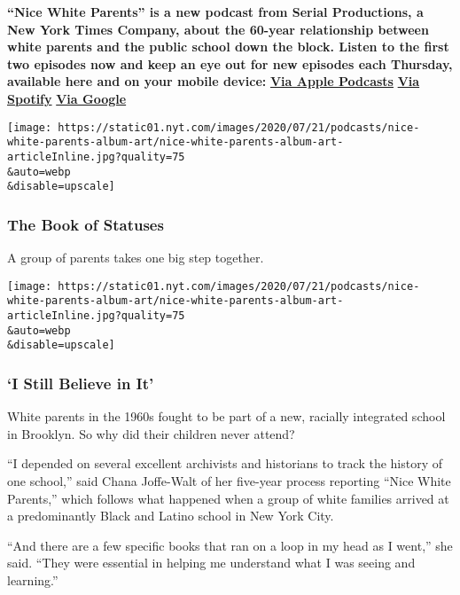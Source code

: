 \textbf{``Nice White Parents'' is a new podcast from Serial Productions,
a New York Times Company, about the 60-year relationship between white
parents and the public school down the block. Listen to the first two
episodes now and keep an eye out for new episodes each Thursday,
available here and on your mobile device:}
\textbf{\href{https://podcasts.apple.com/us/podcast/nice-white-parents/id1524080195}{Via
Apple Podcasts}} \textbf{\textbar{}}
\textbf{\href{https://open.spotify.com/show/7oBSLCZFCgpdCaBjIG8mLV?si=YcEPLD3xT2ejXmpQz-tRpw}{Via
Spotify}} \textbf{\textbar{}}
\textbf{\href{https://podcasts.google.com/feed/aHR0cHM6Ly9yc3MuYXJ0MTkuY29tL25pY2Utd2hpdGUtcGFyZW50cw}{Via
Google}}

\texttt{[image: https://static01.nyt.com/images/2020/07/21/podcasts/nice-white-parents-album-art/nice-white-parents-album-art-articleInline.jpg?quality=75\\\&auto=webp\\\&disable=upscale]}

\hypertarget{the-book-of-statuses}{%
\subsubsection{The Book of Statuses}\label{the-book-of-statuses}}

A group of parents takes one big step together.

\texttt{[image: https://static01.nyt.com/images/2020/07/21/podcasts/nice-white-parents-album-art/nice-white-parents-album-art-articleInline.jpg?quality=75\\\&auto=webp\\\&disable=upscale]}

\hypertarget{i-still-believe-in-it}{%
\subsubsection{`I Still Believe in It'}\label{i-still-believe-in-it}}

White parents in the 1960s fought to be part of a new, racially
integrated school in Brooklyn. So why did their children never attend?

``I depended on several excellent archivists and historians to track the
history of one school,'' said Chana Joffe-Walt of her five-year process
reporting ``Nice White Parents,'' which follows what happened when a
group of white families arrived at a predominantly Black and Latino
school in New York City.

``And there are a few specific books that ran on a loop in my head as I
went,'' she said. ``They were essential in helping me understand what I
was seeing and learning.''

